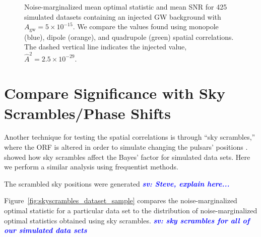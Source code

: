 \documentclass[twocolumn,aps,prd,superscriptaddress]{revtex4-1}
\newcommand{\sv}[1]{\textcolor{blue}{\it{\textbf{sv: #1}}} }
\newcommand{\Agw}{\ensuremath{A_\mathrm{gw}}}
\begin{document}
\begin{figure}[ht]
	\caption{Noise-marginalized mean optimal statistic and mean SNR for 425 simulated datasets 
			containing an injected GW background with $\Agw = 5\times10^{-15}$. 
			We compare the values found using monopole (blue), dipole (orange), and quadrupole (green) 
			spatial correlations. 
			The dashed vertical line indicates the injected value, $\hat{A}^2 = 2.5 \times 10^{-29}$.}
	\label{fig:os_ORF}
\end{figure}


\section{Compare Significance with Sky Scrambles/Phase Shifts}
\label{sec:skyscrambles}

Another technique for testing the spatial correlations is through ``sky scrambles,'' 
where the ORF is altered in order to simulate changing the pulsars' positions \citep{cs2016}. 
\citet{tlb+2017} showed how sky scrambles affect the Bayes' factor for simulated data sets. 
Here we perform a similar analysis using frequentist methods.

The scrambled sky positions were generated \sv{Steve, explain here...}

Figure~\ref{fig:skyscrambles_dataset_sample} compares the noise-marginalized optimal statistic 
for a particular data set to the 
distribution of noise-marginalized optimal statistics obtained using sky scrambles.
\sv{sky scrambles for all of our simulated data sets}
\end{document}
